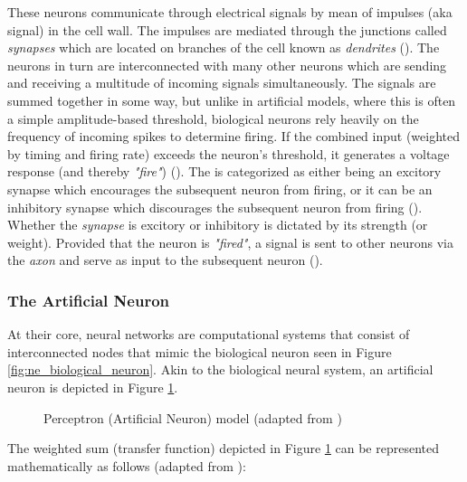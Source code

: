 \noindent These neurons communicate through electrical signals by mean of impulses (aka signal) in the cell wall. The impulses are mediated through the junctions called \textit{synapses} which are located on branches of the cell known as \textit{dendrites} (\cite{gurney2018introduction}). The neurons in turn are interconnected with many other neurons which are sending and receiving a multitude of incoming signals simultaneously. The signals are summed together in some way, but unlike in artificial models, where this is often a simple amplitude-based threshold, biological neurons rely heavily on the frequency of incoming spikes to determine firing. If the combined input (weighted by timing and firing rate) exceeds the neuron's threshold, it generates a voltage response (and thereby \textit{"fire"}) (\cite{gurney2018introduction}). The  is categorized as either being an excitory synapse which encourages the subsequent neuron from firing, or it can be an inhibitory synapse which discourages the subsequent neuron from firing (\cite{bishop1994neural}). Whether the \textit{synapse} is excitory or inhibitory is dictated by its strength (or weight). Provided that the neuron is \textit{"fired"}, a signal is sent to other neurons via the \textit{axon} and serve as input to the subsequent neuron (\cite{gurney2018introduction}). \bigskip

\subsubsection{The Artificial Neuron}
\noindent At their core, neural networks are computational systems that consist of interconnected nodes that mimic the biological neuron seen in Figure \ref{fig:ne_biological_neuron}. Akin to the biological neural system, an artificial neuron is depicted in Figure \ref{fig:ne_artificial_neuron}. 

\begin{figure}[H] %
	\centering %
	\caption{Perceptron (Artificial Neuron) model (adapted from \cite{russell2016artificial})}
	\label{fig:ne_artificial_neuron} %
\end{figure}

\noindent The weighted sum (transfer function) depicted in Figure \ref{fig:ne_artificial_neuron} can be represented mathematically as follows (adapted from \cite{suzuki2011artificial}):

